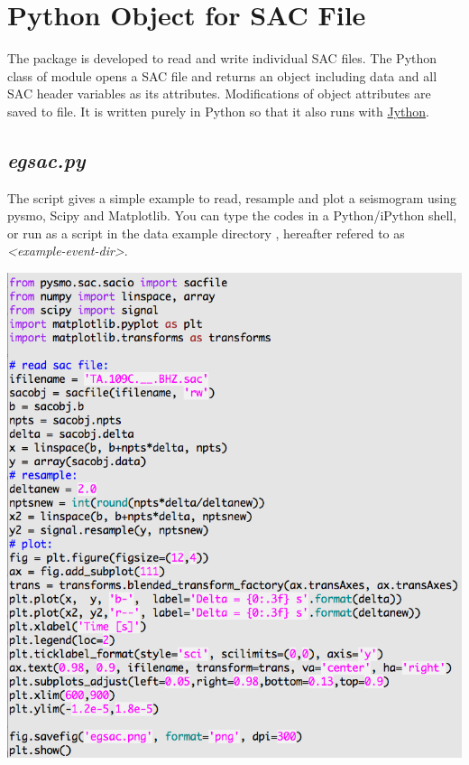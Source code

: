 \documentclass[letterpaper,10pt,english]{sphinxmanual}
\begin{document}
\section{Python Object for SAC File}
\label{docfiles/SACdataAccess:python-object-for-sac-file}
The  package is developed to read and write individual SAC files.
The Python class  of module  opens a SAC file and returns an object including data and all SAC header variables as its attributes. Modifications of object attributes are saved to file. It is written purely in Python so that it also runs with \href{http://www.jython.org}{Jython}.


\subsection{\emph{egsac.py}}
\label{docfiles/SACdataAccess:egsac-py}
The  script gives a simple example to read, resample and plot a seismogram using pysmo, Scipy and Matplotlib. You can type the codes in a Python/iPython shell, or run as a script in the data example directory , hereafter refered to as \emph{\textless{}example-event-dir\textgreater{}}.

\includegraphics{prog-egsac.png}
\end{document}
